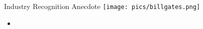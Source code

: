 \documentclass{beamer}
\begin{document}
\begin{frame}{Industry Recognition Anecdote}
\texttt{[image: pics/billgates.png]} 
\end{frame}

\begin{frame}{}
\begin{itemize}
\item 
\end{itemize}

\end{frame}



\begin{frame}{}

\end{frame}

\begin{frame}{}

\end{frame}
\end{document}
